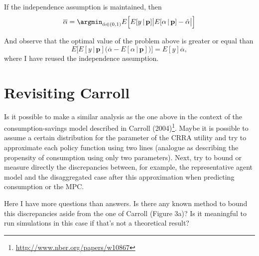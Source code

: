 \documentclass[english, a4paper,12pt]{article}
\begin{document}
If the independence assumption is maintained, then
	$$\overline{\alpha} = \argmin_{\hat{\alpha} \in (0,1)} E\Big[ E[y\,|\,\mathbf{p}]\big|E[\alpha \, | \, \mathbf{p}] - \hat{\alpha}\big| \Big] $$

And observe that the optimal value of the problem above is greater or equal than
	$$E\Big[ E[y\,|\,\mathbf{p}]\big(\overline{\alpha} - E[\alpha \, | \, \mathbf{p}] \big) \Big] = E[y]\overline{\alpha},$$
where I have reused the independence assumption.

\section{Revisiting Carroll}
Is it possible to make a similar analysis as the one above in the context of the consumption-savings model described in Carroll (2004)\footnote{\url{http://www.nber.org/papers/w10867}}. Maybe it is possible to assume a certain distribution for the parameter of the CRRA utility and try to approximate each policy function using two lines (analogue as describing the propensity of consumption using only two parameters). Next, try to bound or measure directly the discrepancies between, for example, the representative agent model and the disaggregated case after this approximation when predicting consumption or the MPC.

Here I have more questions than answers. Is there any known method to bound this discrepancies aside from the one of Carroll (Figure 3a)? Is it meaningful to run simulations in this case if that's not a theoretical result? 



\end{document}
